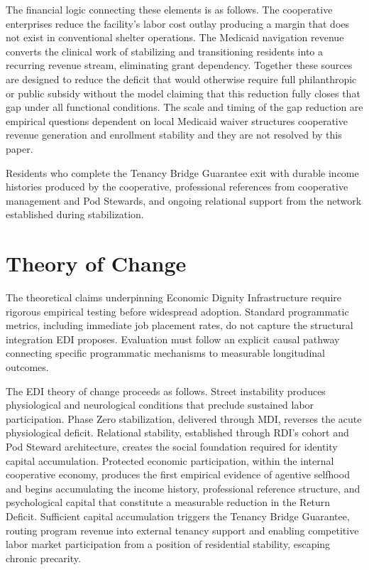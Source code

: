 \documentclass[12pt, letterpaper]{article}
\begin{document}
The financial logic connecting these elements is as follows. The cooperative enterprises reduce the facility's labor cost outlay producing a margin that does not exist in conventional shelter operations. The Medicaid navigation revenue converts the clinical work of stabilizing and transitioning residents into a recurring revenue stream, eliminating grant dependency. Together these sources are designed to reduce the deficit that would otherwise require full philanthropic or public subsidy without the model claiming that this reduction fully closes that gap under all functional conditions. The scale and timing of the gap reduction are empirical questions dependent on local Medicaid waiver structures cooperative revenue generation and enrollment stability and they are not resolved by this paper.

Residents who complete the Tenancy Bridge Guarantee exit with durable income histories produced by the cooperative, professional references from cooperative management and Pod Stewards, and ongoing relational support from the network established during stabilization.

\section{Theory of Change}

The theoretical claims underpinning Economic Dignity Infrastructure require rigorous empirical testing before widespread adoption. Standard programmatic metrics, including immediate job placement rates, do not capture the structural integration EDI proposes. Evaluation must follow an explicit causal pathway connecting specific programmatic mechanisms to measurable longitudinal outcomes.

The EDI theory of change proceeds as follows. Street instability produces physiological and neurological conditions that preclude sustained labor participation. Phase Zero stabilization, delivered through MDI, reverses the acute physiological deficit. Relational stability, established through RDI's cohort and Pod Steward architecture, creates the social foundation required for identity capital accumulation. Protected economic participation, within the internal cooperative economy, produces the first empirical evidence of agentive selfhood and begins accumulating the income history, professional reference structure, and psychological capital that constitute a measurable reduction in the Return Deficit. Sufficient capital accumulation triggers the Tenancy Bridge Guarantee, routing program revenue into external tenancy support and enabling competitive labor market participation from a position of residential stability, escaping chronic precarity.
\end{document}
